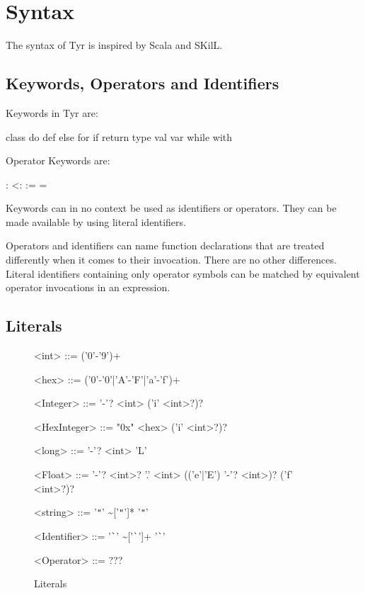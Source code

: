 \section{Syntax}

The syntax of Tyr is inspired by Scala and SKilL.

\subsection{Keywords, Operators and Identifiers}

Keywords in Tyr are:
\begin{center}
class
	\quad do
    \quad def
	\quad else
	\quad for
	\quad if
	\quad return
	\quad type
    \quad val
	\quad var
	\quad while
	\quad with
\end{center}
Operator Keywords are:
\begin{center}
 :
\quad <:
\quad :=
\quad =
\end{center}

Keywords can in no context be used as identifiers or operators.
They can be made available by using literal identifiers.

Operators and identifiers can name function declarations that are treated differently when it comes to their invocation.
There are no other differences.
Literal identifiers containing only operator symbols can be matched by equivalent operator invocations in an expression.

\subsection{Literals}


\begin{figure}
	\begin{grammar}
		<int> ::= ('0'-'9')+
		
		<hex> ::= ('0'-'0'|'A'-'F'|'a'-'f')+
		
		<Integer> ::= '-'? <int> ('i' <int>?)?
		
		<HexInteger> ::= "0x" <hex> ('i' <int>?)?
		
		<long> ::= '-'? <int> 'L'
		
		<Float> ::= '-'? <int>? '.' <int> (('e'|'E') '-'? <int>)? ('f' <int>?)?
		
		<string> ::= '\verb|"|' \textasciitilde['\verb|"|']* '\verb|"|'
		
		<Identifier> ::= '\verb|`|' \textasciitilde['\verb|`|']+ '\verb|`|'
		
		<Operator> ::= ???
	\end{grammar}
	\caption{Literals}
	\label{fig:syn:literals}
\end{figure}

